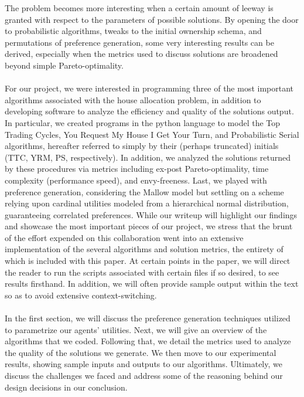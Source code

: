 \documentclass[12pt]{article}
\begin{document}
The problem becomes more interesting when a certain amount of leeway is granted with respect to the parameters of possible solutions. By opening the door to probabilistic algorithms, tweaks to the initial ownership schema, and permutations of preference generation, some very interesting results can be derived, especially when the metrics used to discuss solutions are broadened beyond simple Pareto-optimality.\\\\For our project, we were interested in programming three of the most important algorithms associated with the house allocation problem, in addition to developing software to analyze the efficiency and quality of the solutions output. In particular, we created programs in the python language to model the Top Trading Cycles, You Request My House I Get Your Turn, and Probabilistic Serial algorithms, hereafter referred to simply by their (perhaps truncated) initials (TTC, YRM, PS, respectively). In addition, we analyzed the solutions returned by these procedures via metrics including ex-post Pareto-optimality, time complexity (performance speed), and envy-freeness. Last, we played with preference generation, considering the Mallow model but settling on a scheme relying upon cardinal utilities modeled from a hierarchical normal distribution, guaranteeing correlated preferences. While our writeup will highlight our findings and showcase the most important pieces of our project, we stress that the brunt of the effort expended on this collaboration went into an extensive implementation of the several algorithms and solution metrics, the entirety of which is included with this paper. At certain points in the paper, we will direct the reader to run the scripts associated with certain files if so desired, to see results firsthand. In addition, we will often provide sample output within the text so as to avoid extensive context-switching.\\\\In the first section, we will discuss the preference generation techniques utilized to parametrize our agents' utilities. Next, we will give an overview of the algorithms that we coded. Following that, we detail the metrics used to analyze the quality of the solutions we generate. We then move to our experimental results, showing sample inputs and outputs to our algorithms. Ultimately, we discuss the challenges we faced and address some of the reasoning behind our design decisions in our conclusion.
\end{document}
